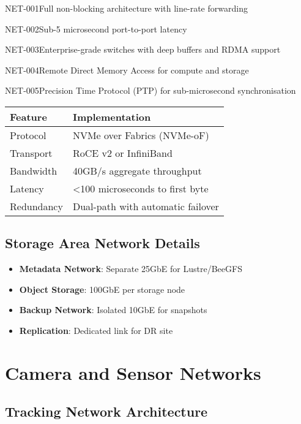 \begin{requirement}{NET-001}{Full non-blocking architecture with line-rate forwarding}
\begin{requirement}{NET-002}{Sub-5 microsecond port-to-port latency}
\begin{requirement}{NET-003}{Enterprise-grade switches with deep buffers and RDMA support}
\begin{requirement}{NET-004}{Remote Direct Memory Access for compute and storage}
\begin{requirement}{NET-005}{Precision Time Protocol (PTP) for sub-microsecond synchronisation}
\begin{table}[H]
\centering
\begin{tabularx}{\textwidth}{@{}lX@{}}
\toprule
\textbf{Feature} & \textbf{Implementation} \\
\midrule
Protocol & NVMe over Fabrics (NVMe-oF) \\
Transport & RoCE v2 or InfiniBand \\
Bandwidth & 40GB/s aggregate throughput \\
Latency & <100 microseconds to first byte \\
Redundancy & Dual-path with automatic failover \\
\bottomrule
\end{tabularx}
\end{table}

\subsection{Storage Area Network Details}

\begin{itemize}
    \item \textbf{Metadata Network}: Separate 25GbE for Lustre/BeeGFS
    \item \textbf{Object Storage}: 100GbE per storage node
    \item \textbf{Backup Network}: Isolated 10GbE for snapshots
    \item \textbf{Replication}: Dedicated link for DR site
\end{itemize}

\section{Camera and Sensor Networks}

\subsection{Tracking Network Architecture}

\begin{figure}[H]
\centering
{}
\end{figure}
\end{requirement}
\end{requirement}
\end{requirement}
\end{requirement}
\end{requirement}
